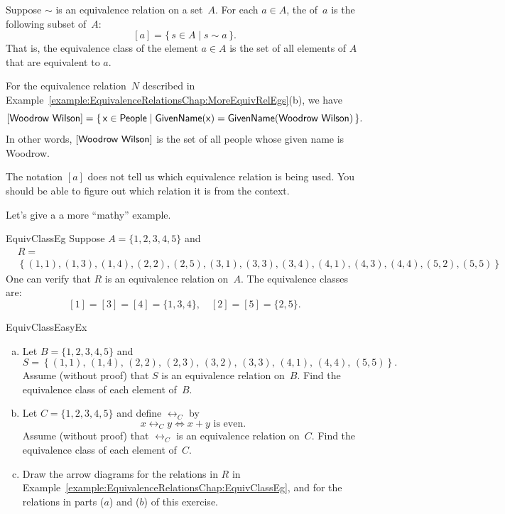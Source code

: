  \begin{defn}\label{DefEquivRel}
 Suppose $\sim$ is an equivalence relation on a set~$A$. For each $a \in A$, the  of~$a$ is the following subset of~$A$:
 	$$ [a] = \{\, s \in A \mid s \sim a \,\} .$$
That is, the equivalence class of the element $a \in A$ is the set of all elements of $A$ that are equivalent to $a$.
\end{defn}


\begin{example}{}
For the equivalence relation~$N$ described in Example~\ref{example:EquivalenceRelationsChap:MoreEquivRelEgs}(b), we have
	$$ [\sf{Woodrow\,\,Wilson}] = \{\, x \in \sf{People} \mid \sf{GivenName}(x) = \sf{GivenName}(\sf{Woodrow\,\,Wilson}) \,\} .$$
In other words, $[\sf{Woodrow\,\,Wilson}]$ is the set of all people whose given name is Woodrow.
\end{example}

\begin{warn}
The notation $[a]$ does not tell us which equivalence relation is being used. You should be able to figure out which relation it is from the context.
\end{warn}

Let's give a a more ``mathy'' example.

\begin{example}{EquivClassEg}
Suppose $A = \{1,2,3,4,5\}$ and 
\begin{align*}
&R = \\
&\left\{  (1,1), (1,3), (1,4), (2,2), (2,5), (3,1), (3,3), 
		(3,4), (4,1), (4,3), (4,4), (5,2), (5,5) 
\right\}
\end{align*}
One can verify that $R$ is an equivalence relation on~$A$. The equivalence classes are:
$$ [1] = [3] = [4] = \{1,3,4\},
\quad [2] = [5] = \{2,5\}.$$
\end{example}

\begin{exercise}{EquivClassEasyEx}
\begin{enumerate}[(a)]
\item \label{EquivClassEasyEx-set}
Let $B = \{1,2,3,4,5\}$ and 
	$$S = \left\{ (1,1),\, (1,4),\, (2,2),\, (2,3),\, (3,2),\, 
		(3,3),\, (4,1),\, (4,4),\, (5,5)
		 \right\} .$$
Assume (without proof) that $S$ is an equivalence relation on~$B$. Find the equivalence class of each element of~$B$.


\item \label{EquivClassEasyEx-x+y}
Let $C = \{1,2,3,4,5\}$ and define $\rel_C$ by 
\[ x \rel_C y \iff x + y \text{ is even.} \]
Assume (without proof) that $\rel_C$ is an equivalence relation on~$C$. Find the equivalence class of each element of~$C$.
\item
Draw the arrow diagrams for the relations in $R$ in Example~\ref{example:EquivalenceRelationsChap:EquivClassEg}, and for the relations in parts ($a$) and ($b$) of this exercise.
\end{enumerate}
\end{exercise}


